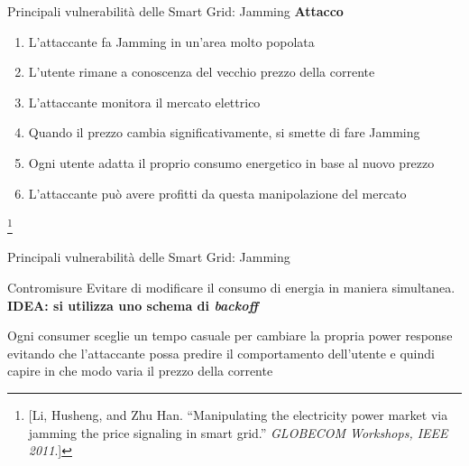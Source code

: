 \begin{frame}{Principali vulnerabilità delle Smart Grid: Jamming}
	\textbf{Attacco}\\
	\begin{enumerate}[<+- | alert@+>]
		\item L'attaccante fa Jamming in un'area molto popolata
		\item L'utente rimane a conoscenza del vecchio prezzo della corrente
		\item L'attaccante monitora il mercato elettrico
		\item Quando il prezzo cambia significativamente, si smette di fare Jamming
		\item Ogni utente adatta il proprio consumo energetico in base al nuovo prezzo
		\item L'attaccante può avere profitti da questa manipolazione del mercato
	\end{enumerate}
	\let\thefootnote\relax\footnote{\small [Li, Husheng, and Zhu Han. ``Manipulating the electricity power market via jamming the price signaling in smart grid.'' \emph{GLOBECOM Workshops, IEEE 2011}.]}
\end{frame}

\begin{frame}{Principali vulnerabilità delle Smart Grid: Jamming}
	\begin{block}{Contromisure}
		Evitare di modificare il consumo di energia in maniera simultanea.\newline
		\textbf{\color{blue_slides}IDEA: si utilizza uno schema di \emph{backoff}}
	\end{block}
	\pause
	\begin{block}{}
	Ogni consumer sceglie un tempo casuale per cambiare la propria power response evitando che l'attaccante possa predire il comportamento dell'utente e quindi capire in che modo varia il prezzo della corrente
	\end{block}
\end{frame}